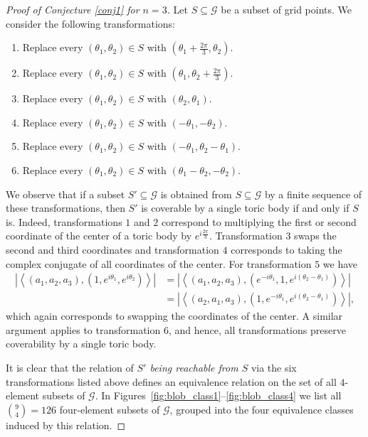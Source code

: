 \documentclass[12pt, a4paper]{article}
\theoremstyle{plain} %
\theoremstyle{definition} %
\theoremstyle{remark} %
\begin{document}
\begin{proof}[Proof of Conjecture \ref{conj1} for $n=3$]
Let $S \subseteq \mathcal{G}$ be a subset of grid points. We consider the following transformations:
\begin{enumerate}
    \item Replace every $(\theta_1, \theta_2) \in S$ with $\left (\theta_1 + \frac{2\pi}{3}, \theta_2 \right )$.
    \item Replace every $(\theta_1, \theta_2) \in S$ with $\left ( \theta_1, \theta_2+\frac{2\pi}{3} \right )$.
    \item Replace every $(\theta_1, \theta_2) \in S$ with $(\theta_2, \theta_1)$.
    \item Replace every $(\theta_1, \theta_2) \in S$ with $(-\theta_1, -\theta_2)$.
    \item Replace every $(\theta_1, \theta_2) \in S$ with $(-\theta_1, \theta_2-\theta_1)$.
    \item Replace every $(\theta_1, \theta_2) \in S$ with $(\theta_1-\theta_2, -\theta_2)$.
\end{enumerate}
We observe that if a subset $S' \subseteq \mathcal{G}$ is obtained from $S \subseteq \mathcal{G}$ by a finite sequence of these transformations, then $S'$ is coverable by a single toric body if and only if $S$ is. Indeed, transformations $1$ and $2$ correspond to multiplying the first or second coordinate of the center of a toric body by $e^{i \frac{2\pi}{3}}$. Transformation $3$ swaps the second and third coordinates and transformation $4$ corresponds to taking the complex conjugate of all coordinates of the center. For transformation $5$ we have
\begin{align*}
\left | \left  \langle (a_1, a_2, a_3), \left (1, e^{i\theta_1}, e^{i\theta_2} \right)  \right \rangle \right | &= \left | \left  \langle (a_1, a_2, a_3), \left (e^{-i \theta_1}, 1, e^{i(\theta_2-\theta_1)} \right)  \right \rangle \right | \\
&=\left | \left  \langle (a_2, a_1, a_3), \left (1, e^{-i \theta_1}, e^{i(\theta_2-\theta_1)} \right)  \right \rangle \right |,
\end{align*}
which again corresponds to swapping the coordinates of the center. A similar argument applies to transformation $6$, and hence, all transformations preserve coverability by a single toric body.

It is clear that the relation of \emph{$S'$ being reachable from $S$} via the six transformations listed above defines an equivalence relation on the set of all $4$-element subsets of $\mathcal{G}$. In Figures~\ref{fig:blob_class1}--\ref{fig:blob_class4} we list all $\binom{9}{4}=126$ four-element subsets of $\mathcal{G}$, grouped into the four equivalence classes induced by this relation.


\end{proof}
\end{document}
